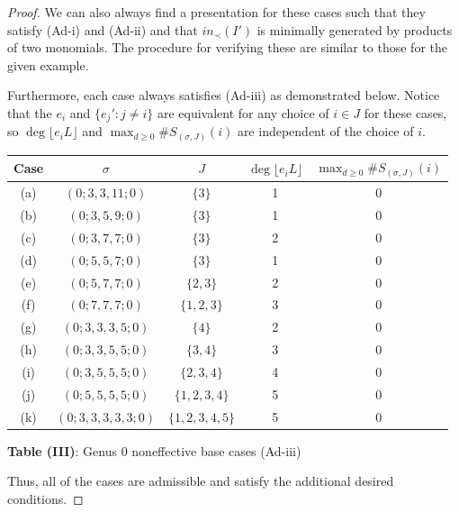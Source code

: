 \documentclass{amsart}
\theoremstyle{plain}
\theoremstyle{definition}
\theoremstyle{remark}
\numberwithin{equation}{section}
\begin{document}
\begin{proof}
We can also always find a presentation for these cases such that
they satisfy (Ad-i) and (Ad-ii) and that $in_\prec(I')$ is
minimally generated by products of two monomials. The procedure for
verifying these are similar to those for the given example.

Furthermore, each case always satisfies (Ad-iii) as demonstrated below.
Notice that the $e_i$ and $\{e_j' : j \neq i\}$ are equivalent
for any choice of $i \in J$ for these cases, so $\deg \lfloor e_i L
\rfloor$ and $\max_{d \geq 0} \#S_{(\sigma, J)}(i)$ are
independent of the choice of $i$.

\begin{longtable}
	{| c | c | c || c | c |}
	\hline
	Case & $\sigma$ & $J$ & $\deg \lfloor e_i L \rfloor$ &
	$\max_{d \geq 0} \#S_{(\sigma, J)}(i)$ \\
	\hline
	\hline

	(a) & $(0; 3, 3, 11; 0)$ & $\{3\}$ & 1 & 0 \\	\hline
	
	(b) & $(0; 3, 5, 9; 0)$ & $\{3\}$ & 1 & 0 \\ \hline
	
	(c) & $(0; 3, 7, 7; 0)$ & $\{3\}$ & 2 & 0 \\ \hline
	
	(d) & $(0; 5, 5, 7; 0)$ & $\{3\}$ & 1 & 0 \\ \hline
	
	(e) & $(0; 5, 7, 7; 0)$ & $\{2, 3\}$ & 2 & 0 \\ \hline

	(f) & $(0; 7, 7, 7; 0)$ & $\{1, 2, 3\}$ & 3 & 0 \\ \hline

	(g) & $(0; 3, 3, 3, 5; 0)$ & $\{4\}$ & 2 & 0 \\ \hline
	
	(h) & $(0; 3, 3, 5, 5; 0)$ & $\{3, 4\}$ & 3 & 0 \\ \hline
	
	(i) & $(0; 3, 5, 5, 5; 0)$ & $\{2, 3, 4\}$ & 4 & 0 \\ \hline
	
	(j) & $(0; 5, 5, 5, 5; 0)$ & $\{1, 2, 3, 4\}$ & 5 & 0 \\ \hline

	(k) & $(0; 3, 3, 3, 3, 3; 0)$ & $\{1, 2, 3, 4, 5\}$ & 5 & 0 \\ \hline
\end{longtable}

\begin{center}
\textbf{Table (III)}: Genus 0 noneffective base cases (Ad-iii)
\end{center}

Thus, all of the cases are admissible and satisfy the additional
desired conditions.
\end{proof}
\end{document}
